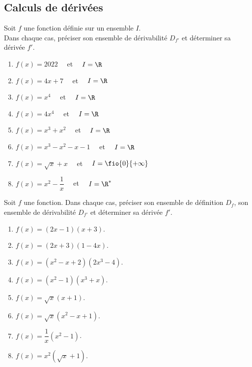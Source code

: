 \documentclass[a4paper,11pt,exos]{nsi} %
\begin{document}
\setlength{\columnseprule}{0pt}
\setlength{\columnsep}{1cm}

\maketitle

\subsection*{Calculs de dérivées}
Soit $f$ une fonction définie sur un ensemble $I$.\\
Dans chaque cas, préciser son ensemble de dérivabilité $D_{f'}$ et déterminer sa dérivée $f'$.
\begin{enumerate}
	\item 	$f(x)=2022 \quad$ et $\quad I=\R\quad$\dotfill
	\item 	$f(x)=4x+7 \quad$ et $\quad I=\R\quad$\dotfill
	\item	$f(x)=x^4 \quad$ et $\quad I=\R\quad$\dotfill
	\item	$f(x)=4x^4 \quad$ et $\quad I=\R\quad$\dotfill
	\item	$f(x)=x^3+x^2 \quad$ et $\quad I=\R\quad$\dotfill
	\item	$f(x)=x^3-x^2-x-1 \quad$ et $\quad I=\R\quad$\dotfill
	\item	$f(x)=\sqrt{x}+x \quad$ et $\quad I=\fio{0}{+\infty}\quad$\dotfill
	\item	$f(x)=x^2-\dfrac{1}{x} \quad$ et $\quad I=\R^*\quad$\dotfill
\end{enumerate}



Soit $f$ une fonction. Dans chaque cas, préciser son ensemble de définition $D_f$, son ensemble de dérivabilité $D_{f'}$ et déterminer sa dérivée $f'$.
\begin{multicols}{2}
	\begin{enumerate}
		\item 	$f(x)=(2x-1)(x+3)$.
		\item	$f(x)=(2x+3)(1-4x)$.
		\item 	$f(x)=(x^2-x+2)(2x^3-4)$.
		\item	$f(x)=(x^2-1)(x^3+x)$.
		\item	$f(x)=\sqrt{x}(x+1)$.
		\item	$f(x)=\sqrt{x}(x^2-x+1)$.
		\item	$f(x)=\dfrac{1}{x}(x^2-1)$.
		\item	$f(x)=x^2\left(\sqrt{x}+1\right)$.
	\end{enumerate}
\end{multicols}
\end{document}
